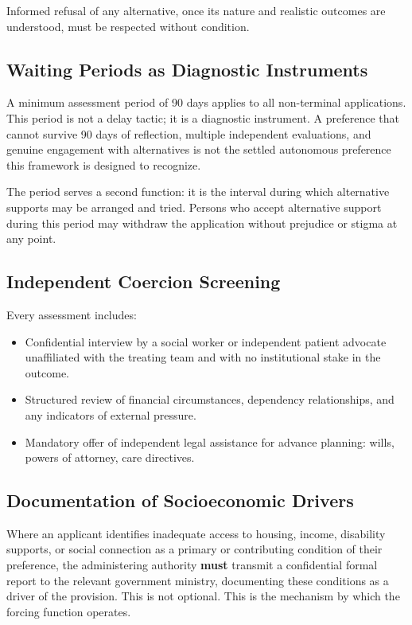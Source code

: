 \documentclass[11pt, letterpaper]{article}
\begin{document}
Informed refusal of any alternative, once its nature and realistic outcomes are understood,
must be respected without condition.

\subsection{Waiting Periods as Diagnostic Instruments}

A minimum assessment period of 90 days applies to all non-terminal applications. This period
is not a delay tactic; it is a diagnostic instrument. A preference that cannot survive 90 days
of reflection, multiple independent evaluations, and genuine engagement with alternatives is
not the settled autonomous preference this framework is designed to recognize.

The period serves a second function: it is the interval during which alternative supports
may be arranged and tried. Persons who accept alternative support during this period may
withdraw the application without prejudice or stigma at any point.

\subsection{Independent Coercion Screening}

Every assessment includes:

\begin{itemize}
  \item Confidential interview by a social worker or independent patient advocate unaffiliated
    with the treating team and with no institutional stake in the outcome.
  \item Structured review of financial circumstances, dependency relationships, and any
    indicators of external pressure.
  \item Mandatory offer of independent legal assistance for advance planning: wills, powers
    of attorney, care directives.
\end{itemize}

\subsection{Documentation of Socioeconomic Drivers}

Where an applicant identifies inadequate access to housing, income, disability supports,
or social connection as a primary or contributing condition of their preference, the
administering authority \textbf{must} transmit a confidential formal report to the relevant
government ministry, documenting these conditions as a driver of the provision. This is not
optional. This is the mechanism by which the forcing function operates.
\end{document}
